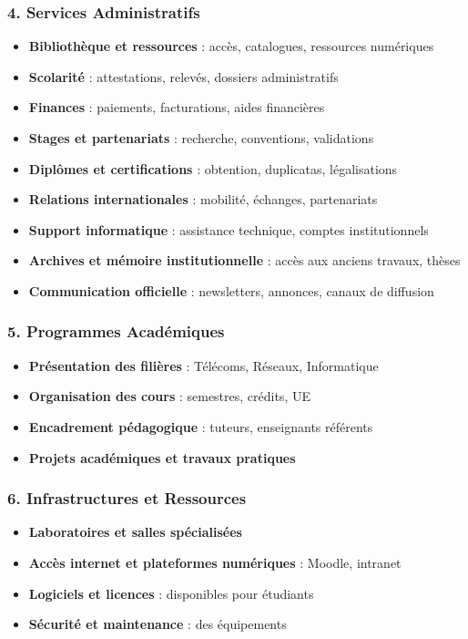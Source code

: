 \documentclass[11pt,a4paper]{article}
\begin{document}
\subsubsection{4. Services Administratifs}
\begin{itemize}
    \item \textbf{Bibliothèque et ressources} : accès, catalogues, ressources numériques
    \item \textbf{Scolarité} : attestations, relevés, dossiers administratifs
    \item \textbf{Finances} : paiements, facturations, aides financières
    \item \textbf{Stages et partenariats} : recherche, conventions, validations
    \item \textbf{Diplômes et certifications} : obtention, duplicatas, légalisations
    \item \textbf{Relations internationales} : mobilité, échanges, partenariats
    \item \textbf{Support informatique} : assistance technique, comptes institutionnels
    \item \textbf{Archives et mémoire institutionnelle} : accès aux anciens travaux, thèses
    \item \textbf{Communication officielle} : newsletters, annonces, canaux de diffusion
\end{itemize}

\subsubsection{5. Programmes Académiques}
\begin{itemize}
    \item \textbf{Présentation des filières} : Télécoms, Réseaux, Informatique
    \item \textbf{Organisation des cours} : semestres, crédits, UE
    \item \textbf{Encadrement pédagogique} : tuteurs, enseignants référents
    \item \textbf{Projets académiques et travaux pratiques}
\end{itemize}

\subsubsection{6. Infrastructures et Ressources}
\begin{itemize}
    \item \textbf{Laboratoires et salles spécialisées}
    \item \textbf{Accès internet et plateformes numériques} : Moodle, intranet
    \item \textbf{Logiciels et licences} : disponibles pour étudiants
    \item \textbf{Sécurité et maintenance} : des équipements
\end{itemize}
\end{document}
